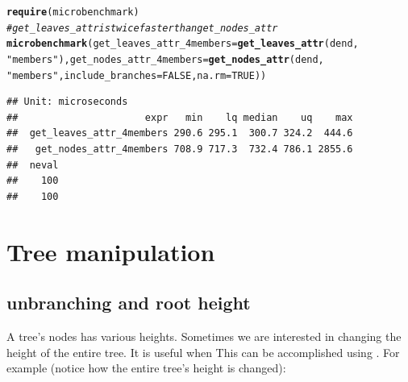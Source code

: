 \documentclass[shortnames,nojss,article]{jss}\usepackage[]{graphicx}\usepackage[]{color}
\makeatletter
\newcommand{\hlnum}[1]{\textcolor[rgb]{0.686,0.059,0.569}{#1}}%
\newcommand{\hlstr}[1]{\textcolor[rgb]{0.192,0.494,0.8}{#1}}%
\newcommand{\hlcom}[1]{\textcolor[rgb]{0.678,0.584,0.686}{\textit{#1}}}%
\newcommand{\hlstd}[1]{\textcolor[rgb]{0.345,0.345,0.345}{#1}}%
\newcommand{\hlkwc}[1]{\textcolor[rgb]{0.333,0.667,0.333}{#1}}%
\newcommand{\hlkwd}[1]{\textcolor[rgb]{0.737,0.353,0.396}{\textbf{#1}}}%
\newenvironment{kframe}{%
 \def\at@end@of@kframe{}%
 \ifinner\ifhmode%
  \def\at@end@of@kframe{\end{minipage}}%
  \begin{minipage}{\columnwidth}%
 \fi\fi%
 \def\FrameCommand##1{\hskip\@totalleftmargin \hskip-\fboxsep
 \colorbox{shadecolor}{##1}\hskip-\fboxsep
     \hskip-\linewidth \hskip-\@totalleftmargin \hskip\columnwidth}%
 \MakeFramed {\advance\hsize-\width
   \@totalleftmargin\z@ \linewidth\hsize
   \@setminipage}}%
 {\par\unskip\endMakeFramed%
 \at@end@of@kframe}
\newenvironment{knitrout}{}{} %
\makeatother
\begin{document}
\begin{knitrout}
\color{fgcolor}\begin{kframe}
\begin{alltt}
\hlkwd{require}\hlstd{(microbenchmark)}
\hlcom{# get_leaves_attr is twice faster than get_nodes_attr}
\hlkwd{microbenchmark}\hlstd{(}\hlkwc{get_leaves_attr_4members} \hlstd{=} \hlkwd{get_leaves_attr}\hlstd{(dend,}
    \hlstr{"members"}\hlstd{),} \hlkwc{get_nodes_attr_4members} \hlstd{=} \hlkwd{get_nodes_attr}\hlstd{(dend,}
    \hlstr{"members"}\hlstd{,} \hlkwc{include_branches} \hlstd{=} \hlnum{FALSE}\hlstd{,} \hlkwc{na.rm} \hlstd{=} \hlnum{TRUE}\hlstd{))}
\end{alltt}
\begin{verbatim}
## Unit: microseconds
##                      expr   min    lq median    uq    max
##  get_leaves_attr_4members 290.6 295.1  300.7 324.2  444.6
##   get_nodes_attr_4members 708.9 717.3  732.4 786.1 2855.6
##  neval
##    100
##    100
\end{verbatim}
\begin{alltt}


\end{alltt}
\end{kframe}
\end{knitrout}







\section{Tree manipulation}

\subsection{unbranching and root height}

A tree's nodes has various heights. Sometimes we are interested in changing the height of the entire tree. It is useful when This can be accomplished using . For example (notice how the entire tree's height is changed):
\end{document}
